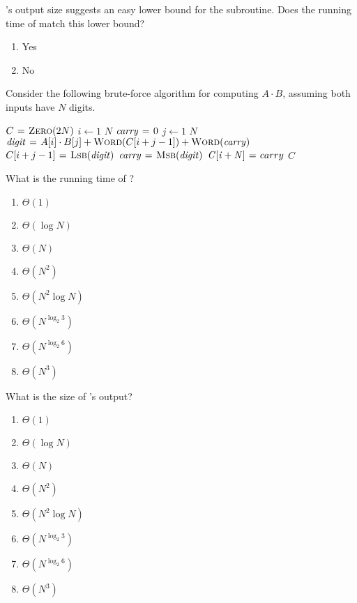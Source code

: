 \documentclass[12pt,twoside]{article}
\begin{document}
\begin{problems}
\begin{problemparts}
\problempart {} 's output size suggests an easy lower bound
for the subroutine. Does the running time of  match this lower bound?
\begin{enumerate}
  \item Yes
  \item No
\end{enumerate}
\end{problemparts}

Consider the following brute-force algorithm for computing $A \cdot B$, assuming
both inputs have $N$ digits.

\begin{codebox}
\li $C \mathrel{\hspace{1pt}=\hspace{1pt}} \textnormal{\scshape Zero}(2N)$
\li \For $i \gets 1$ \To $N$ \label{li:mul-for1}
\li   \Do
        $\id{carry} \gets 0$
\li     \For $j \gets 1$ \To $N$ \label{li:mul-for2}
\li        \Do
             $\id{digit} \gets A[i] \cdot B[j] + \proc{Word}(C[i + j - 1]) +
                               \proc{Word}(\id{carry})$
\li           $C[i + j - 1] \gets \proc{Lsb}(\id{digit})$
\li           $\id{carry} \gets \proc{Msb}(\id{digit})$
           \End
\li     $\id{C[i + N]} \gets carry$
      \End
\li \Return $C$
\end{codebox}

\begin{problemparts}
\problempart {} What is the running time of ?
\begin{enumerate}
  \item $\Theta(1)$
  \item $\Theta(\log N)$
  \item $\Theta(N)$
  \item $\Theta(N^2)$
  \item $\Theta(N^2 \log N)$
  \item $\Theta(N^{\log_2 3})$
  \item $\Theta(N^{\log_2 6})$
  \item $\Theta(N^3)$
\end{enumerate}

\problempart {} What is the size of 's output?
\begin{enumerate}
  \item $\Theta(1)$
  \item $\Theta(\log N)$
  \item $\Theta(N)$
  \item $\Theta(N^2)$
  \item $\Theta(N^2 \log N)$
  \item $\Theta(N^{\log_2 3})$
  \item $\Theta(N^{\log_2 6})$
  \item $\Theta(N^3)$
\end{enumerate}


\end{problemparts}
\end{problems}
\end{document}
